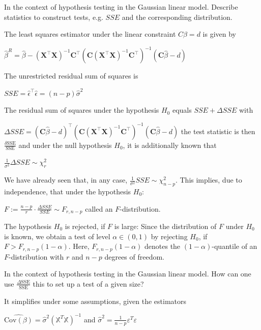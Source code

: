 In the context of hypothesis testing in the Gaussian linear model.
Describe statistics to construct tests, e.g. \( SSE \)
and the corresponding distribution.

The least squares estimator under the linear constraint \(C \beta = d\) is given by

\(
\hat{\beta}^R = \hat{\beta} - (\mathbf{X}^\top \mathbf{X})^{-1} \mathbf{C}^\top \left( \mathbf{C} (\mathbf{X}^\top \mathbf{X})^{-1} \mathbf{C}^\top \right)^{-1} ( \mathbf{C} \hat{\beta} - d )
\)

The unrestricted residual sum of squares is

\(
SSE = \hat{\epsilon}^\top \hat{\epsilon} = (n - p) \hat{\sigma}^2
\)

The residual sum of squares under the hypothesis \(H_0\) equals
\(
SSE + \Delta SSE
\)
with

\(
\Delta SSE = (\mathbf{C} \hat{\beta} - d)^\top \left( \mathbf{C} (\mathbf{X}^\top \mathbf{X})^{-1} \mathbf{C}^\top \right)^{-1} ( \mathbf{C} \hat{\beta} - d )
\)
the test statistic is then \( \frac{\delta \text{SSE}}{\text{SSE}} \)
and under the null hypothesis \( H_0 \), it is additionally known that

\(
\frac{1}{\sigma^2} \Delta SSE \sim \chi^2_r
\)

We have already seen that, in any case, \(\frac{1}{\sigma^2} SSE \sim \chi^2_{n - p}\). 
This implies, due to independence, that under the hypothesis \( H_0 \):

\(
F := \frac{n - p}{r} \cdot \frac{\Delta SSE}{SSE} \sim F_{r, n - p}
\)
called an \( F \)-distribution.


The hypothesis \( H_0 \) is rejected, if \( F \) is large:
Since the distribution of \( F \) under \( H_0 \) is known, we obtain a test of level \(\alpha \in (0, 1)\) by rejecting \( H_0 \), if
\(
F > F_{r, n - p}(1 - \alpha).
\)
Here, \( F_{r, n - p}(1 - \alpha) \) denotes the \((1 - \alpha)\)-quantile of an \( F \)-distribution with \( r \) and \( n - p \) degrees of freedom.


In the context of hypothesis testing in the Gaussian linear model.
How can one use \( \frac{\Delta \text{SSE}}{\text{SSE}} \) this to set up a test of a given size? 

It simplifies under some assumptions,
given the estimators 

\( \hat{\text{Cov}(\mathbb{\beta})} = \hat{\sigma}^2 (\mathbb{X}^T\mathbb{X})^{-1}\)
and \( \hat{\sigma}^2 = \frac{1}{n - p}\varepsilon^T\varepsilon \)

